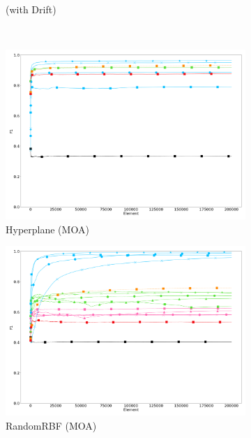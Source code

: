 \begin{figure}
\begin{subfigure}[t]{.49\linewidth}
		\caption{\banosdataset (with Drift)}
		\label{fig:f1-drift}
	\end{subfigure}\\
	\begin{subfigure}[t]{.49\linewidth}
		\includegraphics[width=\linewidth]{figures/results/dataset_1_f1.png}
		\caption{Hyperplane (MOA)}
		\label{fig:f1-dataset_1}
	\end{subfigure}
	\begin{subfigure}[t]{.49\linewidth}
		\includegraphics[width=\linewidth]{figures/results/dataset_2_f1.png}
		\caption{RandomRBF (MOA)}
		\label{fig:f1-dataset_2}
	\end{subfigure}\\
	\begin{subfigure}[t]{.49\linewidth}

\end{subfigure}
\end{figure}
